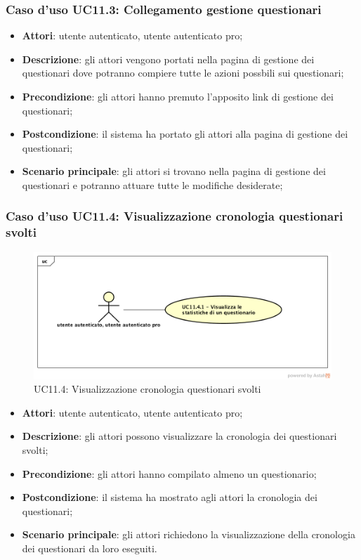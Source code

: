 \subsubsection{Caso d'uso UC11.3: Collegamento gestione questionari}
\begin{itemize}
\item\textbf{Attori}: utente autenticato, utente autenticato pro;
\item\textbf{Descrizione}: gli attori vengono portati nella pagina di gestione dei questionari dove potranno compiere tutte le azioni possbili sui questionari;
\item\textbf{Precondizione}: gli attori hanno premuto l'apposito link di gestione dei questionari;
\item\textbf{Postcondizione}: il sistema ha portato gli attori alla pagina di gestione dei questionari;
\item\textbf{Scenario principale}: gli attori si trovano nella pagina di gestione dei questionari e potranno attuare tutte le modifiche desiderate;
\end{itemize}

\subsubsection{Caso d'uso UC11.4: Visualizzazione cronologia questionari svolti}
\label{UC11.4}
\begin{figure}[h]
	\centering
	\includegraphics[scale=0.5]{UML/UC11_4.png}
	\caption{UC11.4: Visualizzazione cronologia questionari svolti}
\end{figure}
\begin{itemize}
\item\textbf{Attori}: utente autenticato, utente autenticato pro;
\item\textbf{Descrizione}: gli attori possono visualizzare la cronologia dei questionari svolti;
\item\textbf{Precondizione}: gli attori hanno compilato almeno un questionario;
\item\textbf{Postcondizione}: il sistema ha mostrato agli attori la cronologia dei questionari;
\item\textbf{Scenario principale}: gli attori richiedono la visualizzazione della cronologia dei questionari da loro eseguiti.
\end{itemize}

